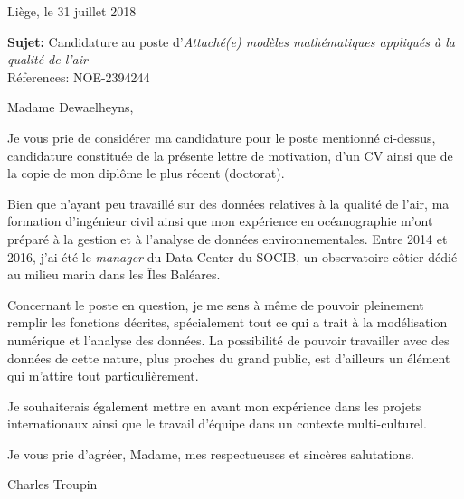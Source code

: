 \documentclass[10pt,a4paper,svgnames]{article}
\newcommand{\imp}[1]{\textcolor{CVblue}{\bf #1}}
\begin{document}
 
\pagestyle{empty}

\hfill Liège, le 31 juillet 2018 

\vspace{1cm}

\noindent\imp{Sujet:} Candidature au poste d'\textit{Attaché(e) modèles mathématiques appliqués à la qualité de l'air}\\
Réferences: NOE-2394244 


\vspace{1cm}

Madame Dewaelheyns,

\vspace{1cm}


Je vous prie de considérer ma candidature pour le poste mentionné ci-dessus, candidature constituée de la présente lettre de motivation, d'un CV ainsi que de la copie de mon diplôme le plus récent (doctorat).

Bien que n'ayant peu travaillé sur des données relatives à la qualité de l'air, ma formation d'ingénieur civil ainsi que mon expérience en océanographie m'ont préparé à la gestion et à l'analyse de données environnementales. Entre 2014 et 2016, j'ai été le \textit{manager} du Data Center du SOCIB, un observatoire côtier dédié au milieu marin dans les Îles Baléares. 

Concernant le poste en question, je me sens à même de pouvoir pleinement remplir les fonctions décrites, spécialement tout ce qui a trait à la modélisation numérique et l'analyse des données. La possibilité de pouvoir travailler avec des données de cette nature, plus proches du grand public, est d'ailleurs un élément qui m'attire tout particulièrement.

Je souhaiterais également mettre en avant mon expérience dans les projets internationaux ainsi que le travail d'équipe dans un contexte multi-culturel.  

\vspace{1cm}
Je vous prie d'agréer, Madame, mes respectueuses et sincères salutations.


\vspace{4cm}

\hfill Charles Troupin
\end{document}
